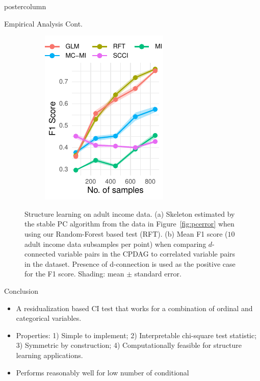 \documentclass{beamer}
\begin{document}
\begin{frame}
\begin{columns}
\begin{column}{0.33\textwidth}
\begin{beamercolorbox}[center]{postercolumn}
\begin{minipage}{.98\textwidth}
{\begin{myblock}{Empirical Analysis Cont.}
\begin{figure}
\begin{subfigure}[b]{0.55\textwidth}
								\caption{}
								\label{fig:sl_adult_model}
							\end{subfigure}%
							\begin{subfigure}[b]{0.4\textwidth}
								\includegraphics[scale=2.7]{../in_person/imgs/adult_F1.pdf}
								\caption{}
								\label{fig:sl_adult}
							\end{subfigure}
							\caption{Structure learning on adult income data. (a) Skeleton
								estimated by the stable PC algorithm from the data in
								Figure~\ref{fig:pcerror} when using our Random-Forest based
								test (RFT). (b) Mean F1 score ($10$ adult income data subsamples
								per point)
								when comparing $d$-connected variable pairs in the CPDAG to
								correlated variable pairs in the dataset. Presence of
								d-connection is used as the positive case for the
								F1 score. Shading: mean $\pm$ standard
								error.}
						\end{figure}
					\end{myblock}\vfill
					\begin{myblock}{Conclusion}
						\begin{itemize}
							\item A residualization based CI test that works for a
								combination of ordinal and categorical variables.
							\item Properties: 1) Simple to implement; 2) Interpretable
								chi-square test statistic; 3) Symmetric by
								construction; 4) Computationally feasible for structure learning applications.
							\item Performs reasonably well for low number of conditional

\end{itemize}
\end{myblock}}
\end{minipage}
\end{beamercolorbox}
\end{column}
\end{columns}
\end{frame}
\end{document}
